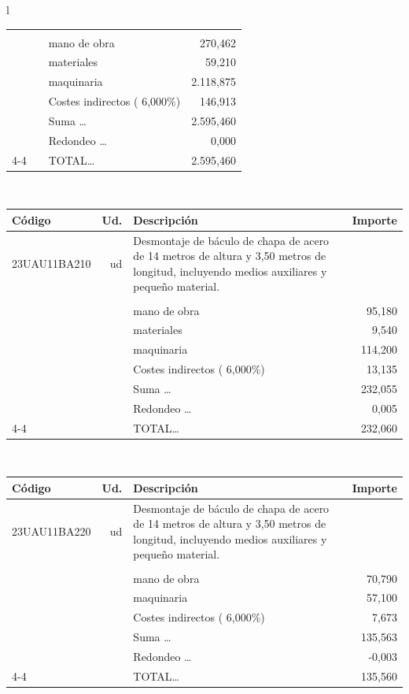 \documentclass{book}%
\begin{document}
\begin{longtable}{l}
\begin{tabular}{l r p{60mm} r}
&&&\\%
&&mano de obra&   270,462\\%
&&materiales&    59,210\\%
&&maquinaria& 2.118,875\\%
&&Costes indirectos (     6,000\%)&   146,913\\%
&&Suma \ldots& 2.595,460\\%
&&Redondeo \ldots&     0,000\\%
\cline{4-4}%
&&TOTAL\ldots& 2.595,460\\%
\end{tabular}\\%
\begin{tabular}{l r p{60mm} r}%
Código&Ud.&Descripción&Importe\\%
\hline%
23UAU11BA210&ud&Desmontaje de báculo de chapa de acero de 14 metros de altura y 3,50 metros de longitud, incluyendo medios auxiliares y pequeño material.&\\%
&&&\\%
&&mano de obra&    95,180\\%
&&materiales&     9,540\\%
&&maquinaria&   114,200\\%
&&Costes indirectos (     6,000\%)&    13,135\\%
&&Suma \ldots&   232,055\\%
&&Redondeo \ldots&     0,005\\%
\cline{4-4}%
&&TOTAL\ldots&   232,060\\%
\end{tabular}\\%
\begin{tabular}{l r p{60mm} r}%
Código&Ud.&Descripción&Importe\\%
\hline%
23UAU11BA220&ud&Desmontaje de báculo de chapa de acero de 14 metros de altura y 3,50 metros de longitud, incluyendo medios auxiliares y pequeño material.&\\%
&&&\\%
&&mano de obra&    70,790\\%
&&maquinaria&    57,100\\%
&&Costes indirectos (     6,000\%)&     7,673\\%
&&Suma \ldots&   135,563\\%
&&Redondeo \ldots&    {-}0,003\\%
\cline{4-4}%
&&TOTAL\ldots&   135,560\\%
\end{tabular}\\%

\end{longtable}
\end{document}
